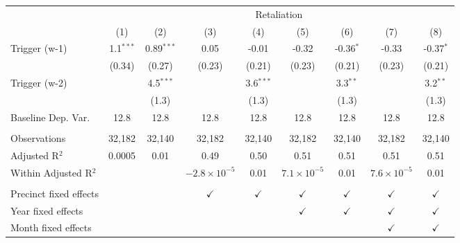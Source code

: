 \begingroup \centering \begin{tabular}{lcccccccc}    \toprule     & \multicolumn{8}{c}{Retaliation}\\                           & (1)         & (2)          & (3)                   & (4)           & (5)                  & (6)           & (7)                  & (8)\\      \midrule     Trigger (w-1)          & 1.1$^{***}$ & 0.89$^{***}$ & 0.05                  & -0.01         & -0.32                & -0.36$^{*}$   & -0.33                & -0.37$^{*}$\\                              & (0.34)      & (0.27)       & (0.23)                & (0.21)        & (0.23)               & (0.21)        & (0.23)               & (0.21)\\       Trigger (w-2)          &             & 4.5$^{***}$  &                       & 3.6$^{***}$   &                      & 3.3$^{**}$    &                      & 3.2$^{**}$\\                              &             & (1.3)        &                       & (1.3)         &                      & (1.3)         &                      & (1.3)\\       Baseline Dep. Var.     & 12.8        & 12.8         & 12.8                  & 12.8          & 12.8                 & 12.8          & 12.8                 & 12.8\\       \\    Observations           & 32,182      & 32,140       & 32,182                & 32,140        & 32,182               & 32,140        & 32,182               & 32,140\\      Adjusted R$^2$         & 0.0005      & 0.01         & 0.49                  & 0.50          & 0.51                 & 0.51          & 0.51                 & 0.51\\      Within Adjusted R$^2$  &             &              & $-2.8\times 10^{-5}$  & 0.01          & $7.1\times 10^{-5}$  & 0.01          & $7.6\times 10^{-5}$  & 0.01\\       \\    Precinct fixed effects &             &              & $\checkmark$          & $\checkmark$  & $\checkmark$         & $\checkmark$  & $\checkmark$         & $\checkmark$\\       Year fixed effects     &             &              &                       &               & $\checkmark$         & $\checkmark$  & $\checkmark$         & $\checkmark$\\       Month fixed effects    &             &              &                       &               &                      &               & $\checkmark$         & $\checkmark$\\       \bottomrule \end{tabular} \par\endgroup